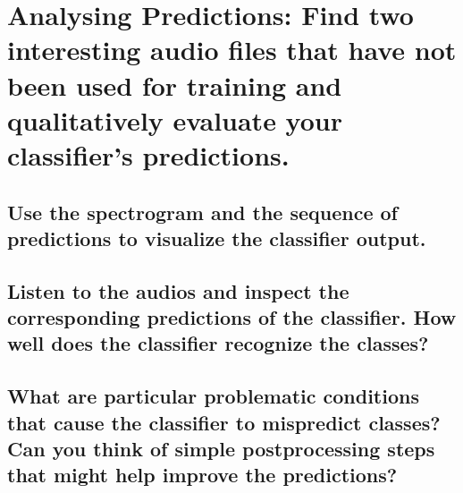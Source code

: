 
\section{Analysing Predictions: {\normalfont\normalsize Find two interesting audio files that have not been used for training and qualitatively evaluate your classifier’s predictions.}}
\label{sec:Analysing Predictions}



\subsection{Use the spectrogram and the sequence of predictions to visualize the classifier output. }
\label{sec:Analysing Predictions:a}






\subsection{Listen to the audios and inspect the corresponding predictions of the classifier. How well does the classifier recognize the classes?}
\label{sec:Analysing Predictions:b}



\subsection{What are particular problematic conditions that cause the classifier to mispredict classes? Can you think of simple postprocessing steps that might help improve the predictions?}
\label{sec:Analysing Predictions:c}





